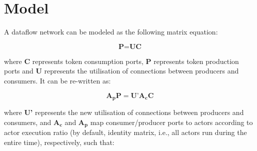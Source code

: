 \section{Model}

A dataflow network can be modeled as the following matrix equation:

\begin{equation}
\textbf{P}=\textbf{U}\textbf{C}
\end{equation}

where \textbf{C} represents token consumption ports, \textbf{P} represents token production ports and \textbf{U} represents the utilisation of connections between producers and consumers. It can be re-written as:

\begin{equation}
\textbf{A}_{\textbf{p}}\textbf{P}=\textbf{U'}\textbf{A}_{\textbf{c}}\textbf{C}
\end{equation}

where \textbf{U'} represents the new utilisation of connections between producers and consumers, and $\textbf{A}_{\textbf{c}}$ and $\textbf{A}_{\textbf{p}}$ map consumer/producer ports to actors according to actor execution ratio (by default, identity matrix, i.e., all actors run during the entire time), respectively, such that:

